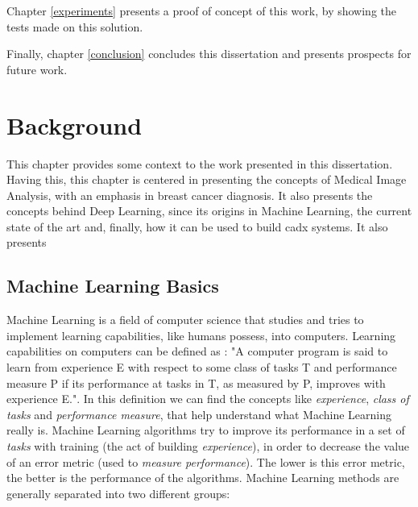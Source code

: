 \documentclass[
  twoside,
  11pt, a4paper,
  footinclude=true,
  headinclude=true,
  cleardoublepage=empty
]{scrbook}
\begin{document}
      Chapter \ref{experiments} presents a proof of concept of this work, by showing the tests made on this solution.

      Finally, chapter \ref{conclusion} concludes this dissertation and presents prospects for future work.

  \chapter{Background} \label{background}
    This chapter provides some context to the work presented in this dissertation. Having this, this chapter is centered in presenting the concepts of Medical Image Analysis, with an emphasis in breast cancer diagnosis. It also presents the concepts behind Deep Learning, since its origins in Machine Learning, the current state of the art and, finally, how it can be used to build \gls{cadx} systems. It also presents

    \section{Machine Learning Basics} \label{background:machine-learning}
      Machine Learning is a field of computer science that studies and tries to implement learning capabilities, like humans possess, into computers. Learning capabilities on computers can be defined as \cite{mitchell1997machine}: "A computer program is said to learn from experience E with respect to some class of tasks T and performance measure P if its performance at tasks in T, as measured by P, improves with experience E.". In this definition we can find the concepts like \textit{experience}, \textit{class of tasks} and \textit{performance measure}, that help understand what Machine Learning really is. Machine Learning algorithms try to improve its performance in a set of \textit{tasks} with training (the act of building \textit{experience}), in order to decrease the value of an error metric (used to \textit{measure performance}). The lower is this error metric, the better is the performance of the algorithms. Machine Learning methods are generally separated into two different groups:
\end{document}
